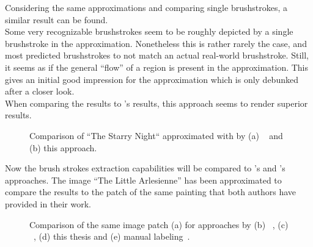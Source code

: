Considering the same approximations and comparing single brushstrokes, a similar result can be found.\\
Some very recognizable brushstrokes seem to be roughly depicted by a single brushstroke in the approximation.
Nonetheless this is rather rarely the case, and most predicted brushstrokes to not match an actual real-world brushstroke.
Still, it seems as if the general ``flow'' of a region is present in the approximation.
This gives an initial good impression for the approximation which is only debunked after a closer look.\\
When comparing the results to \citeauthor*{lpaintb}'s results, this approach seems to render superior results.
\begin{figure*}
    \caption[]{Comparison of ``The Starry Night`` approximated with by (a) \citeauthor*{lpaintb}~\cite{lpaintb} and (b) this approach.}
\end{figure*}


Now the brush strokes extraction capabilities will be compared to \citeauthor*{rhythmic}'s and \citeauthor*{lamberti}'s approaches.
The image ``The Little Arlesienne'' has been approximated to compare the results to the patch of the same painting that both authors have provided in their work.
\begin{figure*}
    \caption[]{Comparison of the same image patch (a) for approaches by (b) \citeauthor*{rhythmic}~\cite{rhythmic}, (c) \citeauthor*{lamberti}~\cite{lamberti}, (d) this thesis and (e) manual labeling~\cite{rhythmic}.}
\end{figure*}


